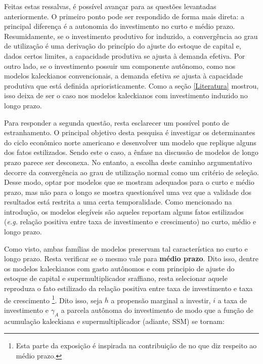 Feitas estas ressalvas, é possível avançar para as questões levantadas anteriormente.  O primeiro ponto pode ser respondido de forma mais direta: a principal diferença é a autonomia do investimento no curto e médio prazo.  Resumidamente, se o investimento produtivo for induzido, a convergência ao grau de utilização é uma derivação do princípio do ajuste do estoque de capital e, dados certos limites, a capacidade produtiva se ajusta à demanda efetiva. Por outro lado, se o investimento possuir um componente autônomo, como nos modelos kaleckianos convencionais, a demanda efetiva se ajusta à capacidade produtiva que está definida aprioristicamente. Como a seção \ref{Literatura} mostrou, isso deixa de ser o caso nos modelos kaleckianos com investimento induzido no longo prazo.

Para responder a segunda questão, resta esclarecer um possível ponto de estranhamento. O principal objetivo desta pesquisa é investigar os determinantes do ciclo econômico norte americano e desenvolver um modelo que replique alguns dos fatos estilizados. Sendo este o caso, a ênfase na discussão de modelos de longo prazo parece ser desconexa. No entanto, a escolha deste caminho argumentativo decorre da convergência ao grau de utilização normal como um critério de seleção. Desse modo, optar por modelos que se mostram adequados para o curto e médio prazo, mas não para o longo se mostra questionável uma vez que a validade dos resultados está restrita a uma certa temporalidade. Como mencionado na introdução, os modelos elegíveis são aqueles reportam alguns fatos estilizados (\textit{e.g.} relação positiva entre taxa de investimento e crescimento)  no curto, médio e longo prazo.

Como visto, ambas famílias de modelos preservam tal característica no curto e longo prazo. Resta verificar se o mesmo vale para \textbf{médio prazo}. Dito isso, dentre os modelos kaleckianos com gasto autônomos e com principio de ajuste do estoque de capital e supermultiplicador sraffiano, resta selecionar aquele reproduza o fato estilizado da relação positiva entre taxa de investimento e taxa de crescimento \cites[p.~172]{cesaratto_neo-kaleckian_2015}[p.~8--9]{fiebiger_trend_2017}\footnote{Esta parte da exposição é inspirada na contribuição de \textcite{fagundes_role_2017} no que diz respeito ao médio prazo.}. Dito isso, seja $h$ a propensão marginal a investir, $i$ a taxa de investimento e $\gamma_A$ a parcela autônoma do investimento de modo que a função de acumulação kaleckiana e supermultiplicador (adiante, SSM) se tornam:

